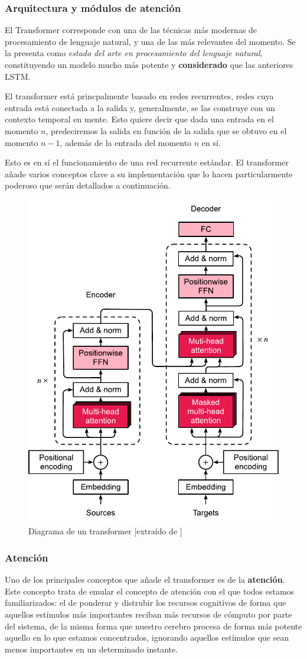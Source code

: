 \subsubsection{Arquitectura y módulos de atención}
El Transformer corresponde con una de las técnicas más modernas de procesamiento de lenguaje natural, y una de las más relevantes del momento. Se la presenta como \textit{estado del arte en procesamiento del lenguaje natural}, constituyendo un modelo mucho más potente y \textbf{considerado} que las anteriores LSTM.

El transformer está princpalmente basado en redes recurrentes, redes cuya entrada está conectada a la salida y, generalmente, se las construye con un contexto temporal en mente. Esto quiere decir que dada una entrada en el momento $n$, predeciremos la salida en función de la salida que se obtuvo en el momento $n - 1$, además de la entrada del momento $n$ en sí.

Esto es en sí el funcionamiento de una red recurrente estándar. El transformer añade varios conceptos clave a su implementación que lo hacen particularmente poderoso que serán detallados a continuación.

\begin{figure}[h]
    \centering
    \includegraphics[width=.5\textwidth]{media/transformer.pdf}
    \caption{Diagrama de un transformer [extraído de \cite{TransformerAshish2017}]}
    \label{fig:transformer}
\end{figure}

\subsubsection{Atención}
Uno de los principales conceptos que añade el transformer es de la \textbf{atención}. Este concepto trata de emular el concepto de atención con el que todos estamos familiarizados: el de ponderar y distrubir los recursos cognitivos de forma que aquellos estímulos más importantes reciban más recursos de cómputo por parte del sistema, de la misma forma que nuestro cerebro procesa de forma más potente aquello en lo que estamos concentrados, ignorando aquellos estímulos que sean menos importantes en un determinado instante.

